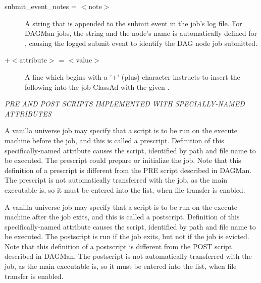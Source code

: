 \begin{description}

\label{man-condor-submit-submit-event-notes}
\item[submit\_event\_notes = $<$note$>$]
A string that is appended to the submit event in the job's log file.
For DAGMan jobs, the string  and the node's name is
automatically defined for ,
causing the logged submit event to identify the DAG node job submitted. 


\item[+$<$attribute$>$ = $<$value$>$] A line which begins with a '+'
(plus) character instructs  to insert the
following  into the job ClassAd with the given 
. 

\end{description} 

\emph{PRE AND POST SCRIPTS IMPLEMENTED WITH SPECIALLY-NAMED ATTRIBUTES}
\begin{description} 


\label{man-condor-submit-prescript}
\item[+PreCmd = $<$executable$>$]
A vanilla universe job may specify that a script is to be run 
on the execute machine before the job, and this is called a prescript.
Definition of this specifically-named attribute causes the script,
identified by path and file name to be executed. 
The prescript could prepare or initialize the job.
Note that this definition of a prescript is different from the PRE script 
described in DAGMan.
The prescript is not automatically transferred with the job,
as the main executable is, 
so it must be entered into the  list,
when file transfer is enabled.


\label{man-condor-submit-postscript}
\item[+PostCmd = $<$executable$>$]
A vanilla universe job may specify that a script is to be run 
on the execute machine after the job exits, and this is called a postscript.
Definition of this specifically-named attribute causes the script,
identified by path and file name to be executed. 
The postscript is run if the job exits, but not if the job is evicted.
Note that this definition of a postscript is different from the POST script 
described in DAGMan.
The postscript is not automatically transferred with the job,
as the main executable is, 
so it must be entered into the  list,
when file transfer is enabled.

\end{description} 


